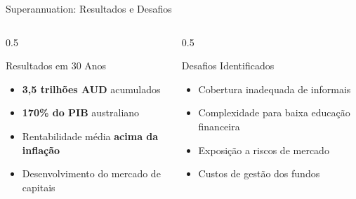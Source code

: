\documentclass{libs/ufc_format}
\begin{document}
\begin{frame}{Superannuation: Resultados e Desafios}
    \begin{columns}
        \begin{column}{0.5\textwidth}
            \begin{exampleblock}{Resultados em 30 Anos}
                \begin{itemize}
                    \item \textbf{3,5 trilhões AUD} acumulados
                    \item \textbf{170\% do PIB} australiano
                    \item Rentabilidade média \textbf{acima da inflação}
                    \item Desenvolvimento do mercado de capitais
                \end{itemize}
            \end{exampleblock}
        \end{column}
        \begin{column}{0.5\textwidth}
            \begin{alertblock}{Desafios Identificados}
                \begin{itemize}
                    \item Cobertura inadequada de informais
                    \item Complexidade para baixa educação financeira
                    \item Exposição a riscos de mercado
                    \item Custos de gestão dos fundos
                \end{itemize}
            \end{alertblock}
        \end{column}
    \end{columns}

    \vspace{0.3cm}

\end{frame}

\end{document}
